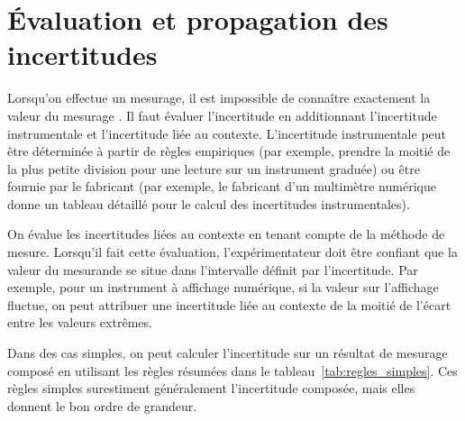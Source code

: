 \documentclass[letterpaper, DIV=11]{scrartcl}
\begin{document}
\section*{Évaluation et propagation des incertitudes}

Lorsqu'on effectue un mesurage, il est impossible de connaître exactement la
valeur du mesurage \cite{jcgm_2008}. Il faut évaluer l'incertitude en additionnant
l'incertitude instrumentale et l'incertitude liée au contexte.
L'incertitude instrumentale peut être déterminée à partir de règles empiriques
(par exemple, prendre la moitié de la plus petite division pour une lecture sur
un instrument graduée) ou être fournie par le fabricant (par exemple, le
fabricant d'un multimètre numérique donne un tableau détaillé pour le calcul des
incertitudes instrumentales).

On évalue les incertitudes liées au contexte en tenant compte de la méthode de
mesure. Lorsqu'il fait cette évaluation, l'expérimentateur doit être confiant
que la valeur du mesurande se situe dans l'intervalle définit par l'incertitude.
Par exemple, pour un instrument à affichage numérique, si la valeur sur
l'affichage fluctue, on peut attribuer une incertitude liée au contexte de la
moitié de l'écart entre les valeurs extrêmes.

Dans des cas simples, on peut calculer l'incertitude sur un résultat de mesurage
composé en utilisant les règles résumées dans le
tableau~\ref{tab:regles_simples}. Ces règles simples surestiment généralement
l'incertitude composée, mais elles donnent le bon ordre de grandeur.
\end{document}
